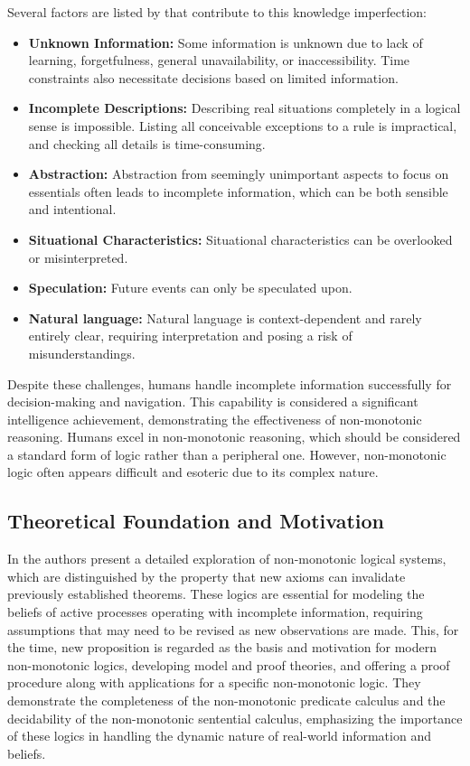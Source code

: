 Several factors are listed by \cite{beierle_methoden_2019} that contribute to this knowledge imperfection:
\begin{itemize}
      \item \textbf{Unknown Information:} Some information is unknown due to lack of learning, forgetfulness, general unavailability, or inaccessibility.
            Time constraints also necessitate decisions based on limited information.
      \item \textbf{Incomplete Descriptions:} Describing real situations completely in a logical sense is impossible.
            Listing all conceivable exceptions to a rule is impractical, and checking all details is time-consuming.
      \item \textbf{Abstraction:} Abstraction from seemingly unimportant aspects to focus on essentials often leads to incomplete information, which can be both sensible and intentional.
      \item \textbf{Situational Characteristics:} Situational characteristics can be overlooked or misinterpreted.
      \item \textbf{Speculation:} Future events can only be speculated upon.
      \item \textbf{Natural language:} Natural language is context-dependent and rarely entirely clear, requiring interpretation and posing a risk of misunderstandings.
\end{itemize}

Despite these challenges, humans handle incomplete information successfully for decision-making and navigation.
This capability is considered a significant intelligence achievement, demonstrating the effectiveness of non-monotonic reasoning.
Humans excel in non-monotonic reasoning, which should be considered a standard form of logic rather than a peripheral one.
However, non-monotonic logic often appears difficult and esoteric due to its complex nature.

\subsection{Theoretical Foundation and Motivation}
In \cite{mcdermott_non-monotonic_1980} the authors present a detailed exploration of non-monotonic logical systems, which are distinguished by the property that new axioms can invalidate previously established theorems.
These logics are essential for modeling the beliefs of active processes operating with incomplete information, requiring assumptions that may need to be revised as new observations are made.
This, for the time, new proposition is regarded as the basis and motivation for modern non-monotonic logics, developing model and proof theories, and offering a proof procedure along with applications for a specific non-monotonic logic.
They demonstrate the completeness of the non-monotonic predicate calculus and the decidability of the non-monotonic sentential calculus, emphasizing the importance of these logics in handling the dynamic nature of real-world information and beliefs.

